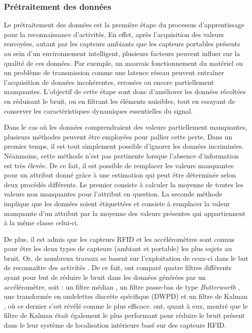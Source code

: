 \subsubsection{Prétraitement des données}

Le prétraitement des données est la première étape du processus d'apprentissage pour la reconnaissance d'activités. En effet, après l'acquisition des valeurs renvoyées, autant par les capteurs ambiants que les capteurs portables présents au sein d'un environnement intelligent, plusieurs facteurs peuvent influer sur la qualité de ces données. Par exemple, un mauvais fonctionnement du matériel ou un problème de transmission comme une latence réseau peuvent entraîner l'acquisition de données incohérentes, erronées ou encore partiellement manquantes. L'objectif de cette étape sont donc d'améliorer les données récoltées en réduisant le bruit, ou en filtrant les éléments nuisibles, tout en essayant de conserver les caractéristiques dynamiques essentielles du signal.

Dans le cas où les données comprendraient des valeurs partiellement manquantes, plusieurs méthodes peuvent être employées pour pallier cette perte. Dans un premier temps, il est tout simplement possible d'ignorer les données incriminées. Néanmoins, cette méthode n'est pas pertinente lorsque l'absence d'information est très élevée. De ce fait, il est possible de remplacer les valeurs manquantes pour un attribut donné grâce à une estimation qui peut être déterminée selon deux procédés différents. Le premier consiste à calculer la moyenne de toutes les valeurs non manquantes pour l'attribut en question. La seconde méthode implique que les données soient étiquettées et consiste à remplacer la valeur manquante d'un attribut par la moyenne des valeurs présentes qui appartiennent à la même classe celui-ci.

De plus, il est admis que les capteurs \ac{RFID} et les accéléromètres sont connus pour être les deux types de capteurs (ambiant et portable) les plus sujets au bruit. Or, de nombreux travaux se basent sur l'exploitation de ceux-ci dans le but de reconnaître des activités \citep{Ravi2005, Stikic2008, Buettner2009, Khan2011, Mannini2017}. De ce fait, \cite{Wang2011} ont comparé quatre filtres différents ayant pour but de réduire le bruit dans les données générées par un accéléromètre, soit : un filtre médian \citep{Huang1979}, un filtre passe-bas de type \textit{Butterworth} \citep{Butterworth1930}, une transformée en ondelettes discrète spécifique (\ac{DWPD}) \citep{Mallat1989} et un filtre de Kalman \citep{Welch2006}, où ce dernier s'est révélé comme le plus efficace. \cite{Abreu2014} ont, quant à eux, montré que le filtre de Kalman était également le plus performant pour réduire le bruit présent dans le leur système de localisation intérieure basé sur des capteurs \acs{RFID}.

